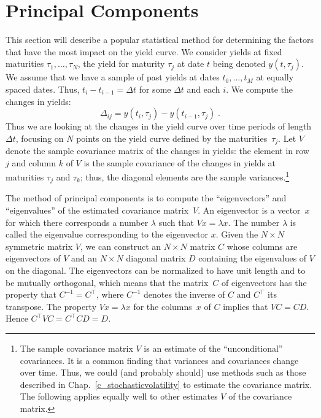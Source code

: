  
\section{Principal Components}\label{s_principalcomponents}

This section will describe a popular statistical method for determining the factors that have the most impact on the yield curve.  We consider yields at fixed maturities $\tau_1, \ldots, \tau_N$, the yield for maturity $\tau_j$ at date $t$ being denoted $y(t,\tau_j)$.  We assume that we have a sample of past yields at dates $t_0, \ldots, t_M$ at equally spaced dates.  Thus, $t_i-t_{i-1} = \varDelta t$  for some $\varDelta t$ and each $i$.  We compute the changes in yields:
$$\varDelta_{ij} = y(t_i, \tau_j) - y(t_{i-1}, \tau_j)\; .$$
Thus we are looking at the changes in the yield curve over time periods of length $\varDelta t$, focusing on $N$ points on the yield curve defined by the maturities~$\tau_j$.  Let $V$ denote the sample covariance matrix  of the changes in  yields: 
 the element in row $j$ and column $k$ of $V$ is the sample covariance of the changes in yields at maturities $\tau_j$ and $\tau_k$; thus, the diagonal elements are the sample variances.\footnote{The sample covariance matrix $V$  is an estimate of the  ``unconditional'' covariances.  It is a common finding that variances and covariances change over time.  Thus,  we could (and probably should) use methods such as those described in Chap.~\ref{c_stochasticvolatility} to estimate the covariance matrix.  The following applies equally well to other estimates $V$ of the covariance matrix.}  

The method of principal components  is to compute the ``eigenvectors'' and ``eigenvalues'' of the estimated covariance matrix~$V$.  An eigenvector  is a vector~$x$ for which there corresponds a number $\lambda$ such that $Vx = \lambda x$.  The number $\lambda$ is called the eigenvalue  corresponding to the eigenvector $x$.  Given the $N \times N$ symmetric matrix $V$, we can construct an $N\times N$ matrix $C$ whose columns are eigenvectors of $V$ and an $N \times N$ diagonal matrix $D$ containing the eigenvalues of $V$ on the diagonal.  The eigenvectors can be normalized to have unit length and to be mutually orthogonal, which means that the matrix~$C$ of eigenvectors has the property that $C^{-1} = C^\top$, where $C^{-1}$ denotes the inverse of $C$ and $C^\top$ its transpose.  The property $Vx = \lambda x$ for the columns~$x$ of $C$ implies that $VC= CD$.  Hence $C^\top VC = C^\top CD = D$.

